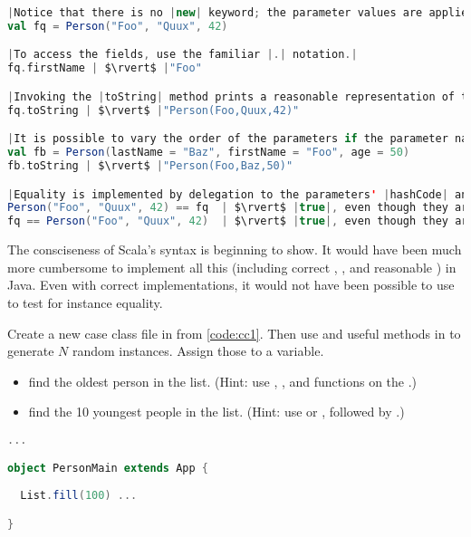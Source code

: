 \documentclass[10 pt]{article}
\begin{document}
\begin{lstlisting}[caption={Using case class \pcode{Person}}, label={code:cc2}, language=Scala, escapechar=|]
|Notice that there is no |new| keyword; the parameter values are applied directly after the case class name.|
val fq = Person("Foo", "Quux", 42)

|To access the fields, use the familiar |.| notation.|
fq.firstName | $\rvert$ |"Foo"

|Invoking the |toString| method prints a reasonable representation of the case class.|
fq.toString | $\rvert$ |"Person(Foo,Quux,42)"

|It is possible to vary the order of the parameters if the parameter names are also specified. This can help readability.|
val fb = Person(lastName = "Baz", firstName = "Foo", age = 50)
fb.toString | $\rvert$ |"Person(Foo,Baz,50)"

|Equality is implemented by delegation to the parameters' |hashCode| and |equals| methods.|
Person("Foo", "Quux", 42) == fq  | $\rvert$ |true|, even though they are \emph{different} instances.|
fq == Person("Foo", "Quux", 42)  | $\rvert$ |true|, even though they are \emph{different} instances.|
\end{lstlisting}

The consciseness of Scala's syntax is beginning to show. It would have been much more cumbersome to implement all this (including correct , , and reasonable ) in Java. Even with correct implementations, it would not have been possible to use \pcode{==} to test for instance equality. 

\begin{example}
Create a new case class  file in  from \autoref{code:cc1}. Then use  and useful methods in  to generate $N$ random  instances. Assign those to a variable.
\begin{itemize}
  \item find the oldest person in the list. (Hint: use , , and  functions on the .)
  \item find the 10 youngest people in the list. (Hint: use  or , followed by .)
\end{itemize}

\begin{lstlisting}[caption={Pattern matching}, label={code:pmex}, language=Scala, escapechar=|]
...

object PersonMain extends App {
  
  List.fill(100) ...  

}
\end{lstlisting}
\end{example}
\end{document}
